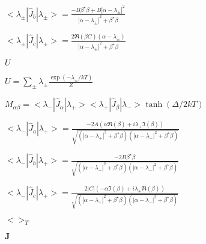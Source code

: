 \documentclass[twoside]{article}
\def\lthtmlcheckvsize{\ifdim\ht\sizebox<\vsize 
  \ifdim\wd\sizebox<\hsize\expandafter\hfill\fi \expandafter\vfill
  \else\expandafter\vss\fi}%
\begin{document}
{\newpage\clearpage
{}%
$\displaystyle <\lambda_{\pm}|\hat J_b|\lambda_{\pm}>=
\frac{-B \beta^{\star}\beta+B|\alpha-\lambda_{\pm}|^2}
{|\alpha-\lambda_{\pm}|^2+\beta^{\star}\beta}
$%
\lthtmlindisplaymathZ
\lthtmlcheckvsize\clearpage}

{\newpage\clearpage
{}%
$\displaystyle <\lambda_{\pm}|\hat J_c|\lambda_{\pm}>=
\frac{2 \Re(\beta C)(\alpha-\lambda_{\pm})}
{|\alpha-\lambda_{\pm}|^2+\beta^{\star}\beta}
$%
\lthtmlindisplaymathZ
\lthtmlcheckvsize\clearpage}

{\newpage\clearpage
{}%
$U$%
\lthtmlindisplaymathZ
\lthtmlcheckvsize\clearpage}

{\newpage\clearpage
{}%
$\displaystyle U=\sum_{\pm}\lambda_{\pm}\frac{\exp(-\lambda_{\pm}/kT)}{Z}
$%
\lthtmlindisplaymathZ
\lthtmlcheckvsize\clearpage}

{\newpage\clearpage
{}%
$\displaystyle M_{\alpha\beta}=<\lambda_-|\hat J_{\alpha}|\lambda_+>
<\lambda_+|\hat J_{\beta}|\lambda_-> \tanh(\Delta/2kT)
$%
\lthtmlindisplaymathZ
\lthtmlcheckvsize\clearpage}

{\newpage\clearpage
{}%
$\displaystyle <\lambda_-|\hat J_a|\lambda_+>=
\frac{-2A (\alpha\Re(\beta)+i\lambda_+ \Im(\beta))}
{\sqrt{(|\alpha-\lambda_{+}|^2+\beta^{\star}\beta)
(|\alpha-\lambda_{-}|^2+\beta^{\star}\beta)}}
$%
\lthtmlindisplaymathZ
\lthtmlcheckvsize\clearpage}

{\newpage\clearpage
{}%
$\displaystyle <\lambda_-|\hat J_b|\lambda_+>=
\frac{-2B \beta^{\star} \beta}
{\sqrt{(|\alpha-\lambda_{+}|^2+\beta^{\star}\beta)
(|\alpha-\lambda_{-}|^2+\beta^{\star}\beta)}}
$%
\lthtmlindisplaymathZ
\lthtmlcheckvsize\clearpage}

{\newpage\clearpage
{}%
$\displaystyle <\lambda_-|\hat J_c|\lambda_+>=
\frac{2|C| (-\alpha\Im(\beta)+i\lambda_+ \Re(\beta))}
{\sqrt{(|\alpha-\lambda_{+}|^2+\beta^{\star}\beta)
(|\alpha-\lambda_{-}|^2+\beta^{\star}\beta)}}
$%
\lthtmlindisplaymathZ
\lthtmlcheckvsize\clearpage}

{\newpage\clearpage
{}%
$<>_T$%
\lthtmlindisplaymathZ
\lthtmlcheckvsize\clearpage}

{\newpage\clearpage
{}%
$\mathbf J$%
\lthtmlindisplaymathZ
\lthtmlcheckvsize\clearpage}
\end{document}
